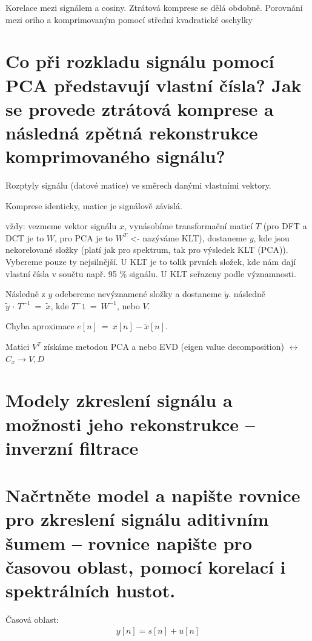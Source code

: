 \documentclass[a4paper,12pt]{article}   %
\begin{document}
Korelace mezi signálem a cosiny. Ztrátová komprese se dělá obdobně. Porovnání mezi oriho a komprimovaným pomocí střední kvadratické oschylky

\section{Co při rozkladu signálu pomocí PCA představují vlastní čísla? Jak se provede ztrátová komprese a následná zpětná rekonstrukce komprimovaného signálu?}

Rozptyly signálu (datové matice) ve směrech danými vlastními vektory.

Komprese identicky, matice je signálově závislá.

vždy:
vezmeme vektor signálu $x$, vynásobíme transformační maticí $T$ (pro DFT a DCT je to $W$, pro PCA je to $W^T$ <- nazýváme KLT), dostaneme $y$, kde jsou nekorelované složky (platí jak pro spektrum, tak pro výsledek KLT (PCA)). Vybereme pouze ty nejsilnější. U KLT je to tolik prvních složek, kde nám dají vlastní čísla v součtu např. 95 \% signálu. U KLT seřazeny podle významnosti.

Následně z $y$ odebereme nevýznamené složky a dostaneme $\tilde{y}$. následně $\tilde{y}\,\cdot\,T^{-1}~=~\tilde{x}$, kde $T^-1~=~W^{-1}$, nebo $V$. 

Chyba aproximace $e[n]~=~x[n] - \tilde{x}[n]$.

Matici $V^T$ získáme metodou PCA a nebo EVD (eigen value decomposition) $\leftrightarrow$ $C_x \rightarrow V, D$


\clearpage

\section*{Modely zkreslení signálu a možnosti jeho rekonstrukce – inverzní filtrace}
\section{Načrtněte model a napište rovnice pro zkreslení signálu aditivním šumem – rovnice napište pro časovou oblast, pomocí korelací i spektrálních hustot.}

Časová oblast:
\begin{align*}
        y[n] = s[n] + u[n]
\end{align*}
\end{document}
